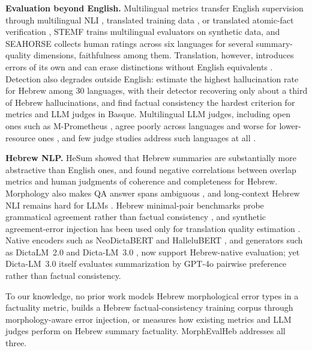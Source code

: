 \documentclass[11pt]{article}
\begin{document}
\textbf{Evaluation beyond English.}
Multilingual metrics transfer English supervision through multilingual NLI \citep{aharoni-etal-2023-multilingual}, translated training data \citep{qiu2023detecting}, or translated atomic-fact verification \citep{shafayat2024multifact}, STEMF \citep{alfano-etal-2026-multilingual} trains multilingual evaluators on synthetic data, and SEAHORSE \citep{clark-etal-2023-seahorse} collects human ratings across six languages for several summary-quality dimensions, faithfulness among them. Translation, however, introduces errors of its own and can erase distinctions without English equivalents \citep{thellmann2026translation}. Detection also degrades outside English: \citet{ul-islam-etal-2025-much} estimate the highest hallucination rate for Hebrew among 30 languages, with their detector recovering only about a third of Hebrew hallucinations, and \citet{barnes2025basse} find factual consistency the hardest criterion for metrics and LLM judges in Basque. Multilingual LLM judges, including open ones such as M-Prometheus \citep{pombal2025mprometheus}, agree poorly across languages and worse for lower-resource ones \citep{fu-liu-2025-reliable,son2024mmeval}, and few judge studies address such languages at all \citep{dogruoz2026llmjudge}.

\textbf{Hebrew NLP.}
HeSum \citep{paz-argaman-etal-2024-hesum} showed that Hebrew summaries are substantially more abstractive than English ones, and \citet{mondshine-etal-2025-beyond} found negative correlations between overlap metrics and human judgments of coherence and completeness for Hebrew. Morphology also makes QA answer spans ambiguous \citep{cohen-etal-2025-heq}, and long-context Hebrew NLI remains hard for LLMs \citep{malul-etal-2025-lchaim}. Hebrew minimal-pair benchmarks probe grammatical agreement rather than factual consistency \citep{gelboim-sulem-2025-tafberta,jumelet-etal-2026-multiblimp}, and synthetic agreement-error injection has been used only for translation quality estimation \citep{siani2026semisynthetic}. Native encoders such as NeoDictaBERT \citep{BenDavid2025neodictabert} and HalleluBERT \citep{schmitt-2026-hallelubert}, and generators such as DictaLM~2.0 \citep{shmidman-etal-2024-dictalm} and Dicta-LM~3.0 \citep{shmidman2026dictalm3}, now support Hebrew-native evaluation; yet Dicta-LM~3.0 itself evaluates summarization by GPT-4o pairwise preference rather than factual consistency.

\noindent To our knowledge, no prior work models Hebrew morphological error types in a factuality metric, builds a Hebrew factual-consistency training corpus through morphology-aware error injection, or measures how existing metrics and LLM judges perform on Hebrew summary factuality. MorphEvalHeb addresses all three.
\end{document}
